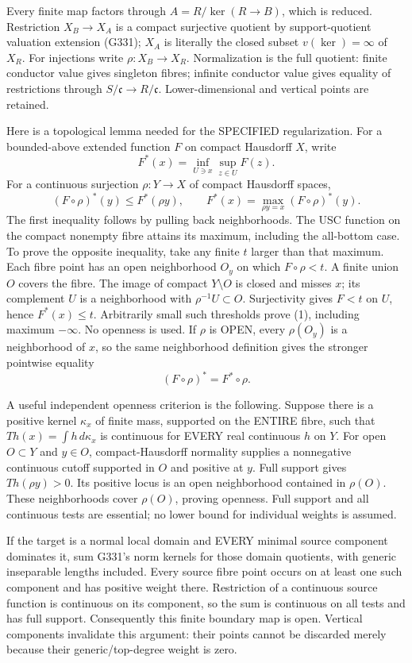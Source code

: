\documentclass[11pt]{article}
\begin{document}
Every finite map factors through $A=R/\ker(R\to B)$, which is reduced. Restriction $X_B\to X_A$ is a compact surjective quotient by support-quotient valuation extension (G331); $X_A$ is literally the closed subset $v(\ker)=\infty$ of $X_R$. For injections write $\rho:X_B\to X_R$. Normalization is the full quotient: finite conductor value gives singleton fibres; infinite conductor value gives equality of restrictions through $S/\mathfrak c\to R/\mathfrak c$. Lower-dimensional and vertical points are retained.

Here is a topological lemma needed for the SPECIFIED regularization. For a bounded-above extended function $F$ on compact Hausdorff $X$, write
\[
F^*(x)=\inf_{U\ni x}\sup_{z\in U}F(z).
\]
For a continuous surjection $\rho:Y\to X$ of compact Hausdorff spaces,
\[
(F\circ\rho)^*(y)\le F^*(\rho y),\qquad
F^*(x)=\max_{\rho y=x}(F\circ\rho)^*(y).                 \tag{1}
\]
The first inequality follows by pulling back neighborhoods. The USC function on the compact nonempty fibre attains its maximum, including the all-bottom case. To prove the opposite inequality, take any finite $t$ larger than that maximum. Each fibre point has an open neighborhood $O_y$ on which $F\circ\rho<t$. A finite union $O$ covers the fibre. The image of compact $Y\setminus O$ is closed and misses $x$; its complement $U$ is a neighborhood with $\rho^{-1}U\subset O$. Surjectivity gives $F<t$ on $U$, hence $F^*(x)\le t$. Arbitrarily small such thresholds prove (1), including maximum $-\infty$. No openness is used. If $\rho$ is OPEN, every $\rho(O_y)$ is a neighborhood of $x$, so the same neighborhood definition gives the stronger pointwise equality
\[
(F\circ\rho)^*=F^*\circ\rho.                          \tag{2}
\]

A useful independent openness criterion is the following. Suppose there is a positive kernel $\kappa_x$ of finite mass, supported on the ENTIRE fibre, such that $Th(x)=\int h\,d\kappa_x$ is continuous for EVERY real continuous $h$ on $Y$. For open $O\subset Y$ and $y\in O$, compact-Hausdorff normality supplies a nonnegative continuous cutoff supported in $O$ and positive at $y$. Full support gives $Th(\rho y)>0$. Its positive locus is an open neighborhood contained in $\rho(O)$. These neighborhoods cover $\rho(O)$, proving openness. Full support and all continuous tests are essential; no lower bound for individual weights is assumed.

If the target is a normal local domain and EVERY minimal source component dominates it, sum G331's norm kernels for those domain quotients, with generic inseparable lengths included. Every source fibre point occurs on at least one such component and has positive weight there. Restriction of a continuous source function is continuous on its component, so the sum is continuous on all tests and has full support. Consequently this finite boundary map is open. Vertical components invalidate this argument: their points cannot be discarded merely because their generic/top-degree weight is zero.
\end{document}
